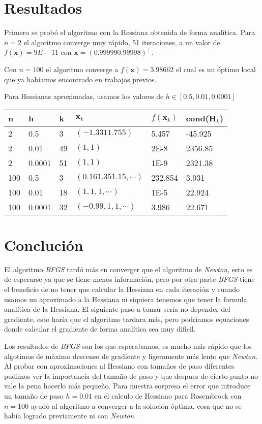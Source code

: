 \documentclass{article}
\begin{document}
\begin{multicols}{2}
\section{Resultados}

Primero se probó el algoritmo con la Hessiana obtenida de forma analítica. Para $n=2$ el algoritmo converge muy rápido, 51 iteraciones, a un valor de $f(\boldsymbol{x}) = 9E-11$ con $\boldsymbol{x} = (0.99999 0.99998)^\intercal$.

Con $n=100$ el algoritmo converge a $f(\boldsymbol{x}) = 3.98662$ el cual es un óptimo local que ya habíamos encontrado en trabajos previos.

Para Hessianas aproximadas, usamos los valores de $h \in [0.5, 0.01, 0.0001]$


\begin{table}[H]
\small
\centering
\label{my-label}
\begin{tabular}{|l|l|l|l|l|l|}
\hline
n & h & k & $\boldsymbol{x}_k$ & $f(\boldsymbol{x}_k)$ & cond($\boldsymbol{H}_k$) \\ \hline
2   & 0.5    &  3 & $(-1.331 1.755)$ &  5.457  & -45.925  \\
2   & 0.01   & 49 & $(1, 1)$ &  2E-8   & 2356.85  \\
2   & 0.0001 & 51 & $(1, 1)$ &  1E-9   & 2321.38  \\
100 & 0.5    &  3 & $(0.16 1.35 1.15, \cdots)$ & 232.854 & 3.031 \\
100 & 0.01   & 18 & $(1, 1, 1, \cdots)$ & 1E-5  & 22.924  \\
100 & 0.0001 & 32 & $(-0.99,1, 1, \cdots)$ & 3.986 & 22.671 \\ \hline
\end{tabular}
\end{table}

\section{Conclución}

El algoritmo \emph{BFGS} tardó más en converger que el algoritmo de \emph{Newton}, esto es de esperarse ya que se tiene menos información, pero por otra parte \emph{BFGS} tiene el beneficio de no tener que calcular la Hessiana en cada iteración y cuando usamos un aproximado a la Hessiana ni siquiera tenemos que tener la formula analítica de la Hessiana. El siguiente paso a tomar sería no depender del gradiente, esto haría que el algoritmo tardara más, pero podríamos equaciones donde calcular el gradiente de forma analítica sea muy dificil.

Los resultados de \emph{BFGS} son los que esperabamos, es mucho más rápido que los algotimos de máximo descenso de gradiente y ligeramente más lento que \emph{Newton}. Al probar con aproximaciones al Hessiano con tamaños de paso diferentes pudimos ver la importancia del tamaño de paso y que despues de cierto punto no vale la pena hacerlo más pequeño. Para nuestra sorpresa el error que introduce un tamaño de paso $h = 0.01$ en el calculo de Hessiano para Rosembrock con $n = 100$ ayudó al algoritmo a converger a la solución óptima, cosa que no se había logrado previamente ni con \emph{Newton}.
\newpage
\end{multicols}
\end{document}
